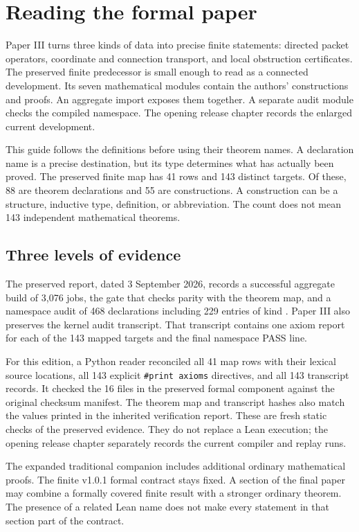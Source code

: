 \section{Reading the formal paper}
Paper III turns three kinds of data into precise finite statements: directed packet operators, coordinate and connection transport, and local obstruction certificates. The preserved finite predecessor is small enough to read as a connected development. Its seven mathematical modules contain the authors' constructions and proofs. An aggregate import exposes them together. A separate audit module checks the compiled namespace. The opening release chapter records the enlarged current development.

This guide follows the definitions before using their theorem names. A declaration name is a precise destination, but its type determines what has actually been proved. The preserved finite map has 41 rows and 143 distinct targets. Of these, 88 are theorem declarations and 55 are constructions. A construction can be a structure, inductive type, definition, or abbreviation. The count does not mean 143 independent mathematical theorems.

\subsection{Three levels of evidence}
The preserved report, dated 3 September 2026, records a successful aggregate build of 3,076 jobs, the gate that checks parity with the theorem map, and a namespace audit of 468 declarations including 229 entries of kind . Paper III also preserves the kernel audit transcript. That transcript contains one axiom report for each of the 143 mapped targets and the final namespace PASS line.

For this edition, a Python reader reconciled all 41 map rows with their lexical source locations, all 143 explicit \texttt{\#print axioms} directives, and all 143 transcript records. It checked the 16 files in the preserved formal component against the original checksum manifest. The theorem map and transcript hashes also match the values printed in the inherited verification report. These are fresh static checks of the preserved evidence. They do not replace a Lean execution; the opening release chapter separately records the current compiler and replay runs.

The expanded traditional companion includes additional ordinary mathematical proofs. The finite v1.0.1 formal contract stays fixed. A section of the final paper may combine a formally covered finite result with a stronger ordinary theorem. The presence of a related Lean name does not make every statement in that section part of the contract.

